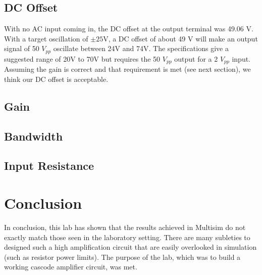 \documentclass[12pt,letterpaper]{report}
\begin{document}
\subsection*{DC Offset}
With no AC input coming in, the DC offset at the output terminal was 49.06 V. With a target oscillation of $\pm 25$V, a DC offset of about 49 V will make an output signal of 50 $V_{pp}$ oscillate between 24V and 74V. The specifications give a suggested range of 20V to 70V but requires the 50 $V_{pp}$ output for a 2 $V_{pp}$ input. Assuming the gain is correct and that requirement is met (see next section), we think our DC offset is acceptable.

\subsection*{Gain}


\subsection*{Bandwidth}


\subsection*{Input Resistance}


\section*{Conclusion}

In conclusion, this lab has shown that the results achieved in Multisim do not exactly match those seen in the laboratory setting. There are many subleties to designed such a high amplification circuit that are easily overlooked in simulation (such as resistor power limits). The purpose of the lab, which was to build a working cascode amplifier circuit, was met.
\end{document}
